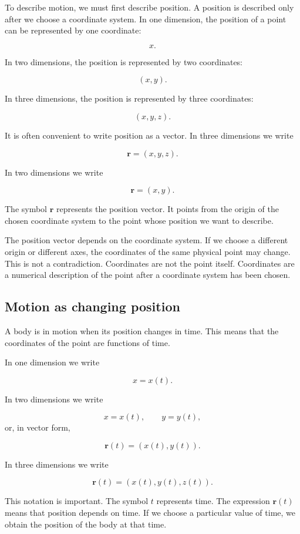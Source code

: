 To describe motion, we must first describe position. A position is described only after we choose a coordinate system. In one dimension, the position of a point can be represented by one coordinate:

\[
x.
\]

In two dimensions, the position is represented by two coordinates:

\[
(x,y).
\]

In three dimensions, the position is represented by three coordinates:

\[
(x,y,z).
\]

It is often convenient to write position as a vector. In three dimensions we write

\[
\mathbf{r} = (x,y,z).
\]

In two dimensions we write

\[
\mathbf{r} = (x,y).
\]

The symbol \(\mathbf{r}\) represents the position vector. It points from the origin of the chosen coordinate system to the point whose position we want to describe.

The position vector depends on the coordinate system. If we choose a different origin or different axes, the coordinates of the same physical point may change. This is not a contradiction. Coordinates are not the point itself. Coordinates are a numerical description of the point after a coordinate system has been chosen.

\subsection{Motion as changing position}

A body is in motion when its position changes in time. This means that the coordinates of the point are functions of time.

In one dimension we write

\[
x = x(t).
\]

In two dimensions we write

\[
x = x(t), \qquad y = y(t),
\]
or, in vector form,

\[
\mathbf{r}(t) = (x(t),y(t)).
\]

In three dimensions we write

\[
\mathbf{r}(t) = (x(t),y(t),z(t)).
\]

This notation is important. The symbol \(t\) represents time. The expression \(\mathbf{r}(t)\) means that position depends on time. If we choose a particular value of time, we obtain the position of the body at that time.

